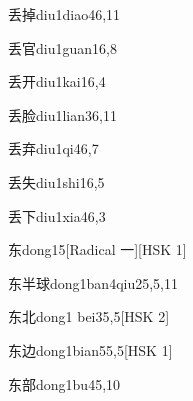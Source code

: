 \begin{entry}{丢掉}{diu1diao4}{6,11}
\end{entry}

\begin{entry}{丢官}{diu1guan1}{6,8}
\end{entry}

\begin{entry}{丢开}{diu1kai1}{6,4}
\end{entry}

\begin{entry}{丢脸}{diu1lian3}{6,11}
\end{entry}

\begin{entry}{丢弃}{diu1qi4}{6,7}
\end{entry}

\begin{entry}{丢失}{diu1shi1}{6,5}
\end{entry}

\begin{entry}{丢下}{diu1xia4}{6,3}
\end{entry}

\begin{entry}{东}{dong1}{5}[Radical ⼀][HSK 1]
\end{entry}

\begin{entry}{东半球}{dong1ban4qiu2}{5,5,11}
\end{entry}

\begin{entry}{东北}{dong1 bei3}{5,5}[HSK 2]
\end{entry}

\begin{entry}{东边}{dong1bian5}{5,5}[HSK 1]
\end{entry}

\begin{entry}{东部}{dong1bu4}{5,10}
\end{entry}

